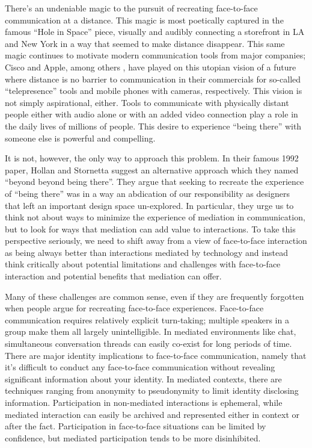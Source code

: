 \documentclass{tufte-handout}
\begin{document}
There's an undeniable magic to the pursuit of recreating face-to-face communication at a distance. This magic is most poetically captured in the famous ``Hole in Space'' \citet{hole_in_space} piece, visually and audibly connecting a storefront in LA and New York in a way that seemed to make distance disappear. This same magic continues to motivate modern communication tools from major companies; Cisco and Apple, among others \citet{commercials}, have played on this utopian vision of a future where distance is no barrier to communication in their commercials for so-called ``telepresence'' tools and mobile phones with cameras, respectively. This vision is not simply aspirational, either. Tools to communicate with physically distant people either with audio alone or with an added video connection play a role in the daily lives of millions of people. This desire to experience ``being there'' with someone else is powerful and compelling. 

It is not, however, the only way to approach this problem. In their famous 1992 paper, Hollan and Stornetta \citet{beyond_being_there} suggest an alternative approach which they named ``beyond beyond being there''. They argue that seeking to recreate the experience of ``being there'' was in a way an abdication of our responsibility as designers that left an important design space un-explored. In particular, they urge us to think not about ways to minimize the experience of mediation in communication, but to look for ways that mediation can add value to interactions. To take this perspective seriously, we need to shift away from a view of face-to-face interaction as being always better than interactions mediated by technology and instead think critically about potential limitations and challenges with face-to-face interaction and potential benefits that mediation can offer. 


Many of these challenges are common sense, even if they are frequently forgotten when people argue for recreating face-to-face experiences. Face-to-face communication requires relatively explicit turn-taking; multiple speakers in a group make them all largely unintelligible. In mediated environments like chat, simultaneous conversation threads can easily co-exist for long periods of time. There are major identity implications to face-to-face communication, namely that it's difficult to conduct any face-to-face communication without revealing significant information about your identity. In mediated contexts, there are techniques ranging from anonymity to pseudonymity to limit identity disclosing information. Participation in non-mediated interactions is ephemeral, while mediated interaction can easily be archived and represented either in context or after the fact. Participation in face-to-face situations can be limited by confidence, but mediated participation tends to be more disinhibited. \citet{???}
\end{document}
